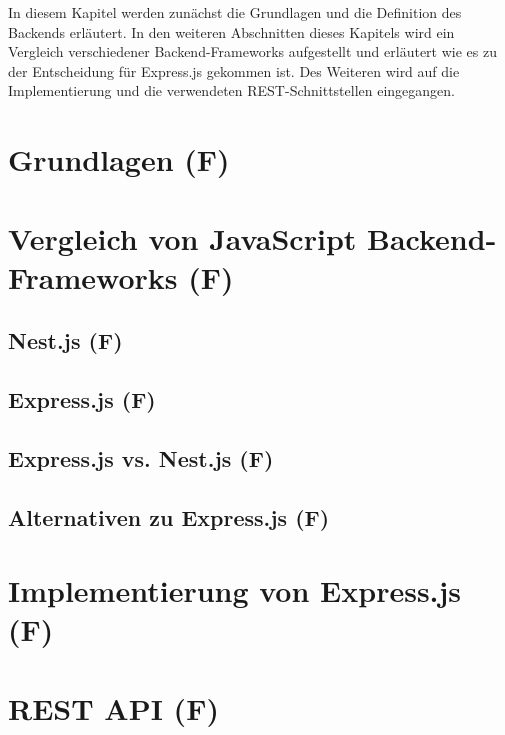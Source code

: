 In diesem Kapitel werden zunächst die Grundlagen und die Definition des Backends erläutert. In den weiteren Abschnitten dieses Kapitels wird ein Vergleich verschiedener Backend-Frameworks aufgestellt und erläutert wie es zu der Entscheidung für Express.js gekommen ist. Des Weiteren wird auf die Implementierung und die verwendeten REST-Schnittstellen eingegangen.

\section{Grundlagen (F)}


\section{Vergleich von JavaScript Backend-Frameworks (F)}


\subsection{Nest.js (F)}


\subsection{Express.js (F)}


\subsection{Express.js vs. Nest.js (F)}


\subsection{Alternativen zu Express.js (F)}


\section{Implementierung von Express.js (F)}


\section{REST API (F)}


